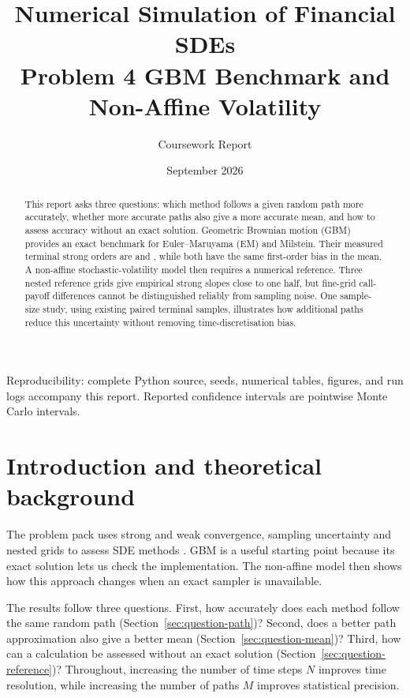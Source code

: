 \documentclass[11pt,a4paper]{article}
\title{Numerical Simulation of Financial SDEs\\
\large Problem 4 GBM Benchmark and Non-Affine Volatility}
\author{Coursework Report}
\date{September 2026}
\begin{document}
\maketitle
\begin{abstract}
This report asks three questions: which method follows a given random path more accurately, whether more accurate paths also give a more accurate mean, and how to assess accuracy without an exact solution. Geometric Brownian motion (GBM) provides an exact benchmark for Euler--Maruyama (EM) and Milstein. Their measured terminal strong orders are \GBMEMRate{} and \GBMMilRate{}, while both have the same first-order bias in the mean. A non-affine stochastic-volatility model then requires a numerical reference. Three nested reference grids give empirical strong slopes close to one half, but fine-grid call-payoff differences cannot be distinguished reliably from sampling noise. One sample-size study, using existing paired terminal samples, illustrates how additional paths reduce this uncertainty without removing time-discretisation bias.
\end{abstract}
\tableofcontents
\vfill
\noindent\small Reproducibility: complete Python source, seeds, numerical tables, figures, and run logs accompany this report. Reported confidence intervals are pointwise Monte Carlo intervals.

\newpage
\section{Introduction and theoretical background}
The problem pack uses strong and weak convergence, sampling uncertainty and nested grids to assess SDE methods \cite{pack}. GBM is a useful starting point because its exact solution lets us check the implementation. The non-affine model then shows how this approach changes when an exact sampler is unavailable.

The results follow three questions. First, how accurately does each method follow the same random path (Section~\ref{sec:question-path})? Second, does a better path approximation also give a better mean (Section~\ref{sec:question-mean})? Third, how can a calculation be assessed without an exact solution (Section~\ref{sec:question-reference})? Throughout, increasing the number of time steps $N$ improves time resolution, while increasing the number of paths $M$ improves statistical precision.
\end{document}
